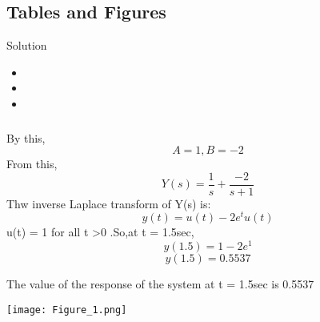 \documentclass[10pt,xcolor={table,dvipsnames},t]{beamer}
\begin{document}
\subsection{Tables and Figures}

\smallframetitle

\begin{frame}{Solution }

\begin{itemize}
We know that, 
\begin{equation}
  Y(s) = X(s)H(s)
\end{equation}
in Laplace domain.So,
\begin{equation}
Y(s) = \frac{-s+1}{s(s+1)}
\end{equation}
By doing partial fractions,
\begin{equation}
    \frac{-s+1}{s(s+1)} = \frac{A}{s} + \frac{B}{s+1}
\end{equation}


\item  \texttt{} 
\item
\item  \texttt{} 
\end{itemize}


\end{frame}





\begin{frame}
\frametitle{}
By this,
\begin{equation}
A = 1 , B = -2
\end{equation}
From this,
\begin{equation}
    Y(s) = \frac{1}{s} + \frac{-2}{s+1}
\end{equation}
Thw inverse Laplace transform of Y(s) is:
\begin{equation}
    y(t) = u(t) - 2e^{t}u(t)
\end{equation}
u(t) = 1 for all t >0 .So,at t = 1.5sec,
\begin{equation}
    y(1.5) = 1 - 2e^{1}
\end{equation}
\begin{equation}
    y(1.5) = 0.5537
\end{equation}

The value of the response of the system at t = 1.5sec is 0.5537


\end{frame}

\normalframetitle

\begin{frame}
   \texttt{[image: Figure\_1.png]}
    
\end{frame}
\end{document}
